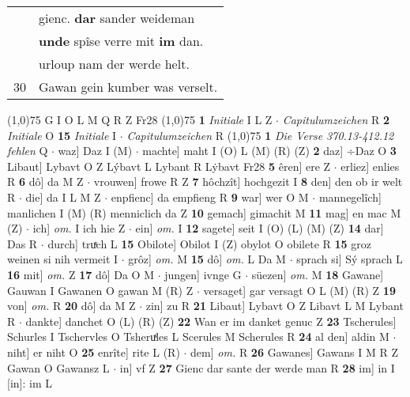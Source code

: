 \documentclass[8pt,a4paper,notitlepage]{article}
\begin{document}
\begin{table}[ht]
\begin{minipage}[t]{0.5\linewidth}
\begin{tabular}{rl}
 & gienc. \textbf{dar} sander weideman\\ 
 & \textbf{unde} spîse verre mit \textbf{im} dan.\\ 
 & urloup nam der werde helt.\\ 
30 & Gawan gein kumber was verselt.\\ 
\end{tabular}
\scriptsize
\line(1,0){75} \newline
G I O L M Q R Z Fr28 \newline
\line(1,0){75} \newline
\textbf{1} \textit{Initiale} I L Z   $\cdot$ \textit{Capitulumzeichen} R  \textbf{2} \textit{Initiale} O  \textbf{15} \textit{Initiale} I   $\cdot$ \textit{Capitulumzeichen} R  \newline
\line(1,0){75} \newline
\textbf{1} \textit{Die Verse 370.13-412.12 fehlen} Q   $\cdot$ waz] Daz I (M)  $\cdot$ machte] maht I (O) L (M) (R) (Z) \textbf{2} daz] ÷Daz O \textbf{3} Libaut] Lybavt O Z Lýbavt L Lybant R Lẏbavt Fr28 \textbf{5} êren] ere Z  $\cdot$ erliez] enlies R \textbf{6} dô] da M Z  $\cdot$ vrouwen] frowe R Z \textbf{7} hôchzît] hochgezit I \textbf{8} den] den ob ir welt R  $\cdot$ die] da I L M Z  $\cdot$ enpfienc] da empfieng R \textbf{9} war] wer O M  $\cdot$ mannegelîch] manlichen I (M) (R) menniclich da Z \textbf{10} gemach] gimachit M \textbf{11} mag] en mac M (Z)  $\cdot$ ich] \textit{om.} I ich hie Z  $\cdot$ ein] \textit{om.} I \textbf{12} sagete] seit I (O) (L) (M) (Z) \textbf{14} dar] Das R  $\cdot$ durch] truͯch L \textbf{15} Obilote] Obilot I (Z) obylot O obilete R \textbf{15} groz weinen si nih vermeit I  $\cdot$ grôz] \textit{om.} M \textbf{15} dô] \textit{om.} L Da M  $\cdot$ sprach si] Sý sprach L \textbf{16} mit] \textit{om.} Z \textbf{17} dô] Da O M  $\cdot$ jungen] ivnge G  $\cdot$ süezen] \textit{om.} M \textbf{18} Gawane] Gauwan I Gawanen O gawan M (R) Z  $\cdot$ versaget] gar versagt O L (M) (R) Z \textbf{19} von] \textit{om.} R \textbf{20} dô] da M Z  $\cdot$ zin] zu R \textbf{21} Libaut] Lybavt O Z Libavt L M Lybant R  $\cdot$ dankte] danchet O (L) (R) (Z) \textbf{22} Wan er im danket genuc Z \textbf{23} Tscherules] Schurles I Tschervles O Tsheruͯles L Scerules M Scherules R \textbf{24} al den] aldin M  $\cdot$ niht] er niht O \textbf{25} enrîte] rite L (R)  $\cdot$ dem] \textit{om.} R \textbf{26} Gawanes] Gawans I M R Z Gawan O Gawansz L  $\cdot$ in] vf Z \textbf{27} Gienc dar sante der werde man R \textbf{28} im] in I [in]: im L \newline

\end{minipage}
\end{table}
\end{document}
